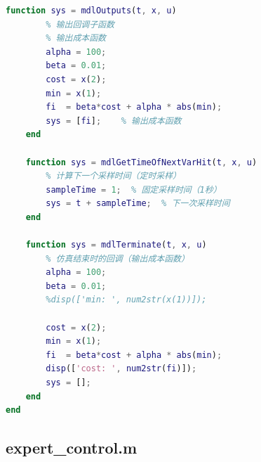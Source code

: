 \documentclass[12pt,a4paper,UTF8]{article}
\begin{document}
\begin{lstlisting}[language=Matlab]
    function sys = mdlOutputs(t, x, u)
        % 输出回调子函数
        % 输出成本函数
        alpha = 100;
        beta = 0.01;
        cost = x(2);
        min = x(1);
        fi  = beta*cost + alpha * abs(min);
        sys = [fi];    % 输出成本函数
    end

    function sys = mdlGetTimeOfNextVarHit(t, x, u)
        % 计算下一个采样时间（定时采样）
        sampleTime = 1;  % 固定采样时间（1秒）
        sys = t + sampleTime;  % 下一次采样时间
    end

    function sys = mdlTerminate(t, x, u)
        % 仿真结束时的回调（输出成本函数）
        alpha = 100;
        beta = 0.01;
        %disp(['min: ', num2str(x(1))]);
        
        cost = x(2);
        min = x(1);
        fi  = beta*cost + alpha * abs(min);
        disp(['cost: ', num2str(fi)]);
        sys = [];
    end
end
\end{lstlisting}


\subsection{expert\_control.m}
\end{document}
